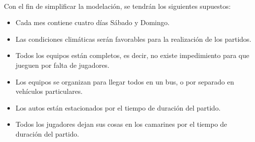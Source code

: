 \indent \\
\indent Con el fin de simplificar la modelación, se tendrán los siguientes supuestos:

\begin{itemize}

    \item Cada mes contiene cuatro días Sábado y Domingo.
    
    \item Las condiciones climáticas serán favorables para la realización de los partidos.
    
    \item Todos los equipos están completos, es decir, no existe impedimiento para que jueguen por falta de jugadores.
    
    \item Los equipos se organizan para llegar todos en un bus, o por separado en vehículos particulares.
    
    \item Los autos están estacionados por el tiempo de duración del partido.
    
    \item Todos los jugadores dejan sus cosas en los camarines por el tiempo de duración del partido.
    
\end{itemize}
